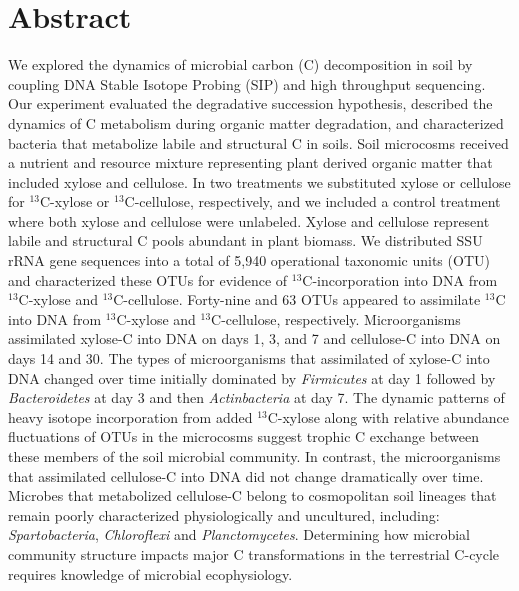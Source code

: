\section{Abstract} We explored the dynamics of microbial carbon (C)
decomposition in soil by coupling DNA Stable Isotope Probing (SIP) and high
throughput sequencing. Our experiment evaluated the degradative succession
hypothesis, described the dynamics of C metabolism during organic matter
degradation, and characterized bacteria that metabolize labile and structural
C in soils. Soil microcosms received a nutrient and resource mixture
representing plant derived organic matter that included xylose and cellulose.
In two treatments we substituted xylose or cellulose for $^{13}$C-xylose or
$^{13}$C-cellulose, respectively, and we included a control treatment where both
xylose and cellulose were unlabeled. Xylose and cellulose represent labile and
structural C pools abundant in plant biomass. We distributed SSU rRNA gene
sequences into a total of 5,940 operational taxonomic units (OTU) and
characterized these OTUs for evidence of $^{13}$C-incorporation into DNA from
$^{13}$C-xylose and $^{13}$C-cellulose. Forty-nine and 63 OTUs appeared to assimilate $^{13}$C
into DNA from $^{13}$C-xylose and $^{13}$C-cellulose, respectively. Microorganisms
assimilated xylose-C into DNA on days 1, 3, and
7 and cellulose-C into DNA on days 14 and 30. The types of microorganisms that
assimilated of xylose-C into DNA changed over time initially dominated by
\textit{Firmicutes} at day 1 followed by \textit{Bacteroidetes} at day 3 and
then \textit{Actinbacteria} at day 7. The dynamic patterns of heavy isotope
incorporation from added $^{13}$C-xylose along with relative abundance fluctuations
of OTUs in the microcosms suggest trophic C exchange between these members of
the soil microbial community. In contrast, the microorganisms that assimilated
cellulose-C into DNA did not change dramatically over time. Microbes that
metabolized cellulose-C belong to cosmopolitan soil lineages that remain poorly
characterized physiologically and uncultured, including:
\textit{Spartobacteria}, \textit{Chloroflexi} and \textit{Planctomycetes}.
Determining how microbial community structure impacts major C transformations
in the terrestrial C-cycle requires knowledge of microbial ecophysiology.
